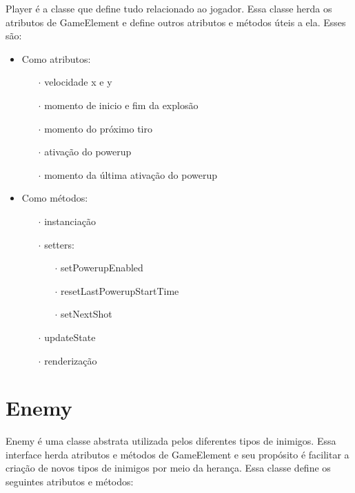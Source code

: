 \documentclass[
	12pt,				%
	oneside,			%
	a4paper,			%
	english,			%
	brazil				%
	]{abntex2ppgsi}
\begin{document}
Player é a classe que define tudo relacionado ao jogador. Essa classe herda os atributos de GameElement e define outros atributos e métodos úteis a ela. Esses são:

\begin{itemize}
    \item Como atributos:
    \begin{itemize}
        \item[$\cdot$] velocidade x e y
        \item[$\cdot$] momento de inicio e fim da explosão
        \item[$\cdot$] momento do próximo tiro
        \item[$\cdot$] ativação do powerup
        \item[$\cdot$] momento da última ativação do powerup
    \end{itemize}
    \item Como métodos:
    \begin{itemize}
        \item[$\cdot$] instanciação
        \item[$\cdot$] setters:
        \begin{itemize}
            \item[$\cdot$] setPowerupEnabled
            \item[$\cdot$] resetLastPowerupStartTime
            \item[$\cdot$] setNextShot
        \end{itemize}
        \item[$\cdot$] updateState
        \item[$\cdot$] renderização
    \end{itemize}
\end{itemize}

\section{Enemy}

Enemy é uma classe abstrata utilizada pelos diferentes tipos de inimigos. Essa interface herda atributos e métodos de GameElement e seu propósito é facilitar a criação de novos tipos de inimigos por meio da herança. Essa classe define os seguintes atributos e métodos:
\end{document}
